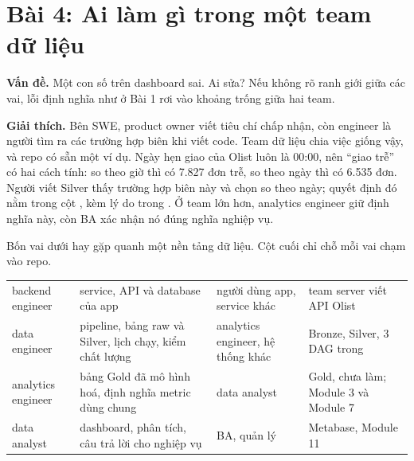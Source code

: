 \section{Bài 4: Ai làm gì trong một team dữ liệu}

\textbf{Vấn đề.} Một con số trên dashboard sai. Ai sửa? Nếu không rõ ranh giới giữa các vai, lỗi định nghĩa như ở Bài 1 rơi vào khoảng trống giữa hai team.

\textbf{Giải thích.} Bên SWE, product owner viết tiêu chí chấp nhận, còn engineer là người tìm ra các trường hợp biên khi viết code. Team dữ liệu chia việc giống vậy, và repo có sẵn một ví dụ. Ngày hẹn giao của Olist luôn là 00:00, nên ``giao trễ'' có hai cách tính: so theo giờ thì có 7.827 đơn trễ, so theo ngày thì có 6.535 đơn. Người viết Silver thấy trường hợp biên này và chọn so theo ngày; quyết định đó nằm trong cột , kèm lý do trong . Ở team lớn hơn, analytics engineer giữ định nghĩa này, còn BA xác nhận nó đúng nghĩa nghiệp vụ.

Bốn vai dưới hay gặp quanh một nền tảng dữ liệu. Cột cuối chỉ chỗ mỗi vai chạm vào repo.

\begin{xltabular}{\textwidth}{@{}P{2.8cm} L P{3.2cm} P{3.4cm}@{}}
\toprule
{} &  &  &  \\
\midrule
\endhead
\bottomrule
\endfoot
backend engineer & service, API và database của app & người dùng app, service khác & team server viết API Olist \\
data engineer & pipeline, bảng raw và Silver, lịch chạy, kiểm chất lượng & analytics engineer, hệ thống khác & Bronze, Silver, 3 DAG trong  \\
analytics engineer & bảng Gold đã mô hình hoá, định nghĩa metric dùng chung & data analyst & Gold, chưa làm; Module 3 và Module 7 \\
data analyst & dashboard, phân tích, câu trả lời cho nghiệp vụ & BA, quản lý & Metabase, Module 11 \\
\end{xltabular}

